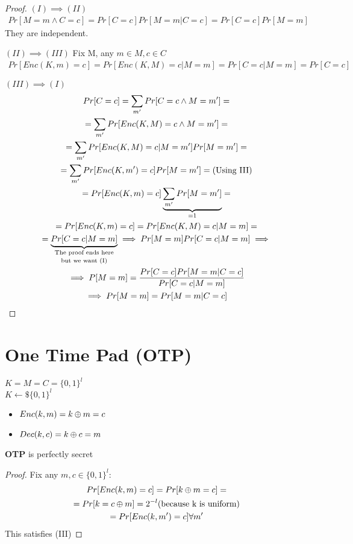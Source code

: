 \begin{proof}

    $(I)\implies(II)$
    \begin{gather*}
        Pr[M=m \wedge C=c]=Pr[C=c]Pr[M=m|C=c]=Pr[C=c]Pr[M=m]   
    \end{gather*}
    They are independent.
    
    $(II)\implies(III)$
    Fix M, any $m\in M, c\in C$
    \begin{gather*}
        Pr[Enc(K,m)=c]=Pr[Enc(K,M)=c|M=m]=Pr[C=c|M=m]=Pr[C=c]   
    \end{gather*}

    $(III)\implies(I)$
    \begin{gather*}
        Pr[C=c]=\sum_{m'}Pr[C=c\wedge M=m']=\\
        =\sum_{m'}Pr[Enc(K,M)=c\wedge M=m']=\\
        =\sum_{m'}Pr[Enc(K,M)=c| M=m']Pr[M=m']=\\
        =\sum_{m'}Pr[Enc(K,m')=c]Pr[M=m']= \text{(Using III)}\\
        =Pr[Enc(K,m)=c]\underbrace{\sum_{m'}Pr[M=m']}_{=1}=\\
        =Pr[Enc(K,m)=c]=Pr[Enc(K,M)=c|M=m]=\\
        =\underbrace{Pr[C=c|M=m]}_{\text{\shortstack{The proof ends here\\but we want (I)}}}\implies Pr[M=m]Pr[C=c|M=m]\implies\\
        \implies P[M=m]=\frac{Pr[C=c]Pr[M=m|C=c]}{Pr[C=c|M=m]}\\
        \implies Pr[M=m]=Pr[M=m|C=c]
    \end{gather*}
\end{proof}

\section{One Time Pad (OTP)}

$K=M=C=\{0,1\}^l$\\
$K\leftarrow\$ \{0,1\}^l$
\begin{itemize}
    \item $Enc(k,m)=k\oplus m=c$
    \item $Dec(k,c)=k\oplus c=m$
\end{itemize}
\begin{theorem}
    \textbf{OTP} is perfectly secret
\end{theorem}
\begin{proof}
    Fix any $m,c \in \{0,1\}^l$:
    \begin{gather*}
        Pr[Enc(k,m)=c]=Pr[k\oplus m=c]=\\
        =Pr[k=c\oplus m]=2^{-l} \text{(because k is uniform)}\\
        =Pr[Enc(k,m')=c] \forall m'    
    \end{gather*}
    This satisfies (III)
\end{proof}

